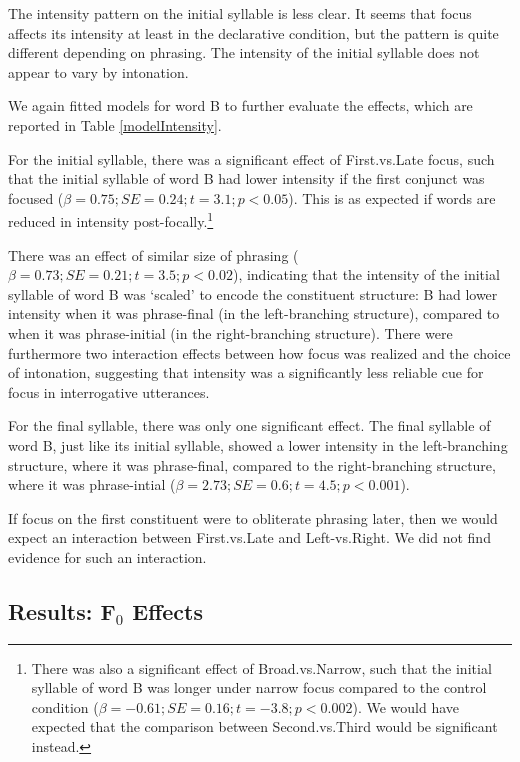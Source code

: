 \documentclass[preprint,review,12pt,authoryear,times]{elsarticle}
\begin{document}
The intensity pattern on the initial syllable is less clear. It seems that focus affects its intensity at least in the declarative condition, but the pattern is quite different depending on phrasing. The intensity of the initial syllable does not appear to vary by intonation. 

We again fitted models for word B to further evaluate the effects, which are reported in Table \ref{modelIntensity}.




For the initial syllable, there was a significant effect of First.vs.Late focus, such that the initial syllable of word B had lower intensity if the first conjunct was focused ($\beta=0.75; SE=0.24; t=3.1; p<0.05$). This is as expected if words are reduced in intensity post-focally.\footnote{There was also a significant effect of Broad.vs.Narrow, such that the initial syllable of word B was longer under narrow focus compared to the control condition ($\beta=-0.61; SE=0.16; t=-3.8; p<0.002$). We would have expected that the comparison between Second.vs.Third would be significant instead.}

There was an effect of similar size of phrasing  ($\beta=0.73; SE=0.21; t=3.5; p<0.02$), indicating that the intensity of the initial syllable of word B was `scaled' to encode the constituent structure: B had lower intensity when it was phrase-final (in the left-branching structure), compared to when it was phrase-initial (in the right-branching structure). There were furthermore two interaction effects between how focus was realized and the choice of intonation, suggesting that intensity was a significantly less reliable cue for focus in interrogative utterances.

For the final syllable, there was only one significant effect. The final syllable of word B, just like its initial syllable, showed a lower intensity in the left-branching structure, where it was phrase-final,  compared to the right-branching structure, where it was phrase-intial ($\beta=2.73; SE=0.6; t=4.5; p<0.001$).  

If focus on the first constituent were to obliterate phrasing later, then we would expect an interaction between First.vs.Late and Left-vs.Right. We did not find evidence for such an interaction.


\subsection{Results: F$_0$ Effects}
\end{document}
